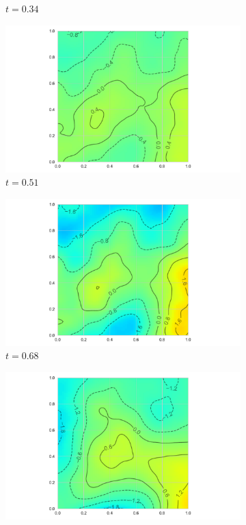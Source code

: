 \begin{figure}
\begin{subfigure}[b]{0.45\textwidth}
		\caption{$t=0.34$}
	\end{subfigure}
	\begin{subfigure}[b]{0.45\textwidth}
		\includegraphics[width=\textwidth]{sim_chi_example_004}
		\caption{$t=0.51$}
	\end{subfigure}  
	\vfill           
	\begin{subfigure}[b]{0.45\textwidth}
		\includegraphics[width=\textwidth]{sim_chi_example_005}
		\caption{$t=0.68$}
	\end{subfigure}             
	\begin{subfigure}[b]{0.45\textwidth}
		\includegraphics[width=\textwidth]{sim_chi_example_006}

\end{subfigure}
\end{figure}
